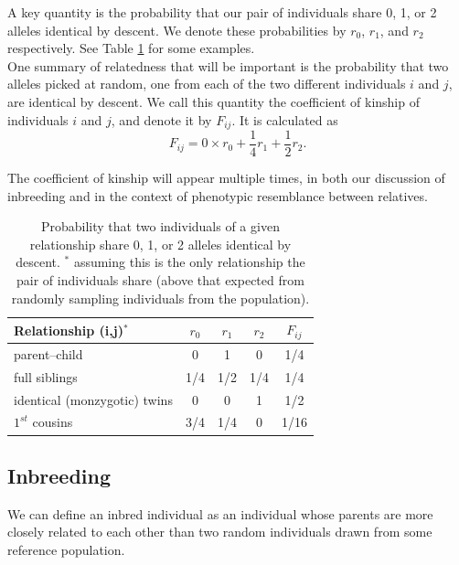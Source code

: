 A key quantity is the probability that our pair of individuals share
0, 1, or 2 alleles identical by descent. We denote these probabilities
by $r_0$, $r_1$, and $r_2$ respectively. See Table \ref{table:IBDprobs} for
some examples. \\

One summary of relatedness that will be important is the probability that two alleles picked at random, one from each of the two different individuals $i$ and $j$, are identical by descent. We call this quantity the coefficient of kinship of individuals $i$ and $j$, and denote it by $F_{ij}$. It is calculated as
\begin{equation}
F_{ij}= 0 \times r_0 + \frac{1}{4} r_1  + \frac{1}{2} r_2. 
\label{eqn:coeffkinship}
\end{equation}

The coefficient of kinship will appear multiple times, in both our discussion of
inbreeding and in the context of phenotypic resemblance between relatives.\\

\begin{table}
\begin{center}
\begin{tabular}{| l | c c c c|}
\hline
Relationship (i,j)$^{*}$ & $r_0$ & $r_1$ & $r_2$ & $F_{ij}$\\
\hline
parent--child & 0 & 1 & 0 & 1/4\\
full siblings & 1/4 & 1/2 & 1/4 & 1/4\\
identical (monzygotic) twins  & 0 & 0 & 1  & 1/2 \\
$1^{st}$ cousins & 3/4 & 1/4 & 0 & 1/16\\
\hline
\end{tabular}
\end{center}
\caption{Probability that two individuals of a given relationship share 0, 1, or 2 alleles
identical by descent. $^{*}$ assuming this is the only relationship
the pair of individuals share (above that expected from randomly
sampling individuals from the population). } \label{table:IBDprobs}
\end{table}

\subsection{Inbreeding}
We can define an inbred individual as an individual whose parents are
more closely related to each other than two random individuals drawn
from some reference population.  \\


